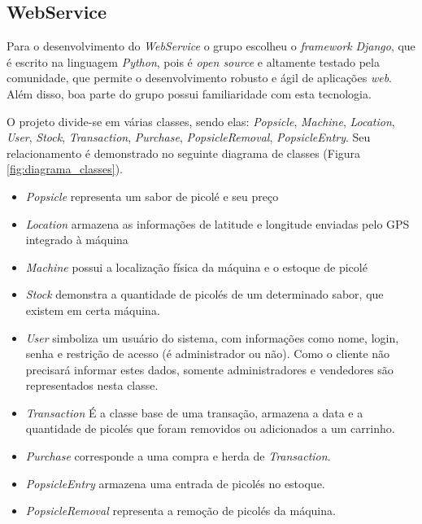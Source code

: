 \subsection{WebService}

Para o desenvolvimento do \textit{WebService} o grupo escolheu o \textit{framework} \textit{Django}, que é escrito na linguagem \textit{Python}, pois é \textit{open source} e altamente testado pela comunidade, que permite o desenvolvimento robusto e ágil de aplicações \textit{web}. Além disso, boa parte do grupo possui familiaridade com esta tecnologia.

O projeto divide-se em várias classes, sendo elas: \textit{Popsicle}, \textit{Machine}, \textit{Location}, \textit{User}, \textit{Stock}, \textit{Transaction}, \textit{Purchase}, \textit{PopsicleRemoval}, \textit{PopsicleEntry}. Seu relacionamento é demonstrado no seguinte diagrama de classes (Figura \ref{fig:diagrama_classes}).


\begin{itemize}
\item \textit{Popsicle} representa um sabor de picolé e seu preço
\item \textit{Location} armazena as informações de latitude e longitude enviadas pelo GPS integrado à máquina
\item \textit{Machine} possui a localização física da máquina e o estoque de picolé
\item \textit{Stock} demonstra a quantidade de picolés de um determinado sabor, que existem em certa máquina.
\item \textit{User} simboliza um usuário do sistema, com informações como nome, login, senha e restrição de acesso (é administrador ou não). Como o cliente não precisará informar estes dados, somente administradores e vendedores são representados nesta classe.
\item \textit{Transaction} É a classe base de uma transação, armazena a data e a quantidade de picolés que foram removidos ou adicionados a um carrinho.
\item \textit{Purchase} corresponde a uma compra e herda de \textit{Transaction}.
\item \textit{PopsicleEntry} armazena uma entrada de picolés no estoque.
\item \textit{PopsicleRemoval} representa a remoção de picolés da máquina.
\end{itemize}

